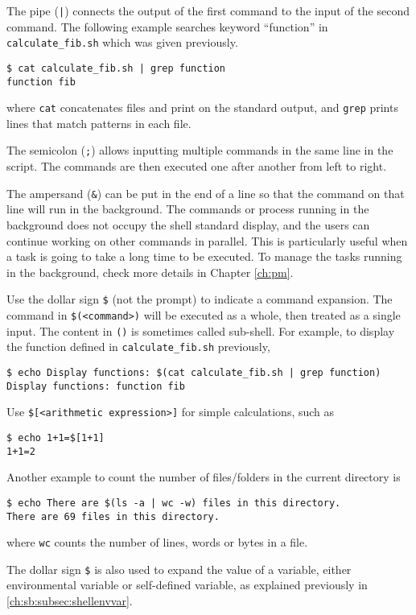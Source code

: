 The pipe (\verb$|$) connects the output of the first command to the input of the second command. The following example searches keyword ``function'' in \verb|calculate_fib.sh| which was given previously.
\begin{lstlisting}
$ cat calculate_fib.sh | grep function
function fib
\end{lstlisting}
where \verb|cat| concatenates files and print on the standard output, and \verb|grep| prints lines that match patterns in each file.

The semicolon (\verb|;|) allows inputting multiple commands in the same line in the script. The commands are then executed one after another from left to right.

The ampersand (\verb|&|) can be put in the end of a line so that the command on that line will run in the background. The commands or process running in the background does not occupy the shell standard display, and the users can continue working on other commands in parallel. This is particularly useful when a task is going to take a long time to be executed. To manage the tasks running in the background, check more details in Chapter \ref{ch:pm}.

Use the dollar sign \verb|$| (not the prompt) to indicate a command expansion. The command in \verb|$(<command>)| will be executed as a whole, then treated as a single input. The content in \verb|()| is sometimes called sub-shell. For example, to display the function defined in \verb|calculate_fib.sh| previously,
\begin{lstlisting}
$ echo Display functions: $(cat calculate_fib.sh | grep function)
Display functions: function fib
\end{lstlisting}
Use \verb|$[<arithmetic expression>]| for simple calculations, such as
\begin{lstlisting}
$ echo 1+1=$[1+1]
1+1=2
\end{lstlisting}
Another example to count the number of files/folders in the current directory is
\begin{lstlisting}
$ echo There are $(ls -a | wc -w) files in this directory.
There are 69 files in this directory.
\end{lstlisting}
where \verb|wc| counts the number of lines, words or bytes in a file.

The dollar sign \verb|$| is also used to expand the value of a variable, either environmental variable or self-defined variable, as explained previously in \ref{ch:sb:subsec:shellenvvar}.

